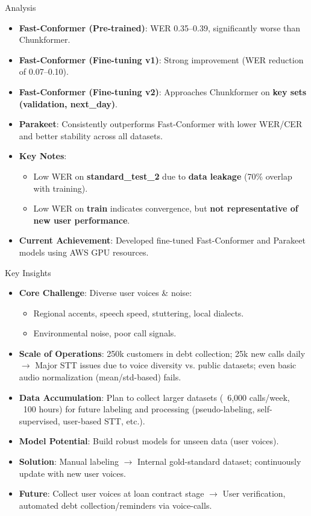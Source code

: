 \documentclass{beamer}
\begin{document}
\begin{frame}{Analysis}
    \begin{itemize}
        \item \textbf{Fast-Conformer (Pre-trained)}: WER 0.35--0.39, significantly worse than Chunkformer.
        \item \textbf{Fast-Conformer (Fine-tuning v1)}: Strong improvement (WER reduction of 0.07--0.10).
        \item \textbf{Fast-Conformer (Fine-tuning v2)}: Approaches Chunkformer on \textbf{key sets (validation, next\_day)}.
        \item \textbf{Parakeet}: Consistently outperforms Fast-Conformer with lower WER/CER and better stability across all datasets.
        \item \textbf{Key Notes}:
            \begin{itemize}
                \item Low WER on \textbf{standard\_test\_2} due to \textbf{data leakage} (70\% overlap with training).
                \item Low WER on \textbf{train} indicates convergence, but \textbf{not representative of new user performance}.
            \end{itemize}
        \item \textbf{Current Achievement}: Developed fine-tuned Fast-Conformer and Parakeet models using AWS GPU resources.
    \end{itemize}
\end{frame}

\begin{frame}{Key Insights}
    \begin{itemize}
        \item \textbf{Core Challenge}: Diverse user voices \& noise:
            \begin{itemize}
                \item Regional accents, speech speed, stuttering, local dialects.
                \item Environmental noise, poor call signals.
            \end{itemize}
        \item \textbf{Scale of Operations}: 250k customers in debt collection; 25k new calls daily $\to$ Major STT issues due to voice diversity vs. public datasets; even basic audio normalization (mean/std-based) fails.
        \item \textbf{Data Accumulation}: Plan to collect larger datasets (~6,000 calls/week, ~100 hours) for future labeling and processing (pseudo-labeling, self-supervised, user-based STT, etc.).
        \item \textbf{Model Potential}: Build robust models for unseen data (user voices).
        \item \textbf{Solution}: Manual labeling $\to$ Internal gold-standard dataset; continuously update with new user voices.
        \item \textbf{Future}: Collect user voices at loan contract stage $\to$ User verification, automated debt collection/reminders via voice-calls.
    \end{itemize}
\end{frame}
\end{document}

